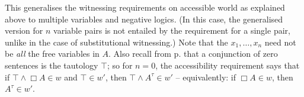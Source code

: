 \documentclass[11pt]{woarticle}
\newcommand{\cmnt}[1]{\iffalse #1 \fi}
\theoremstyle{break}
\theoremstyle{nonumberplain}
\newcommand{\1}{\;\,|\;\,}
\newcommand{\verum}{\top}
\begin{document}
This generalises the witnessing requirements on accessible world as explained
above to multiple variables and negative logics. (In this case, the generalised
version for $n$ variable pairs is not entailed by the requirement for a single
pair, unlike in the case of substitutional witnessing.) Note that the
$x_1,\ldots,x_n$ need not be \emph{all} the free variables in $A$. Also recall
from p.\pageref{conventions} that a conjunction of zero sentences is the
tautology $\verum$; so for $n=0$, the accessibility requirement says that if
$\verum \land \Box A\in w$ and $\verum \in w'$, then
$\verum \land A^\tau \in w'$ -- equivalently: if $\Box A \in w$, then
$A^\tau \in w'$.

\cmnt{%
  We could have required that each $x_i$ is distinct from $y_i$,
  mirroring the possible restriction of substitutional witnesses to
  non-trivial substitutions (see p.~\pageref{nontrivial} above). If
  $x_i$ is $y_i$, clause 5 says that if $x\!=\!x \land \Box A \in w$,
  and $x^\tau\!=\!x^\tau \in w'$, then $z\!=\!x^\tau \land
  [z/x^\tau]A^\tau \in w'$ for some new $z$. Again, this is pointless
  but I think it does no harm.%
} %
\end{document}
